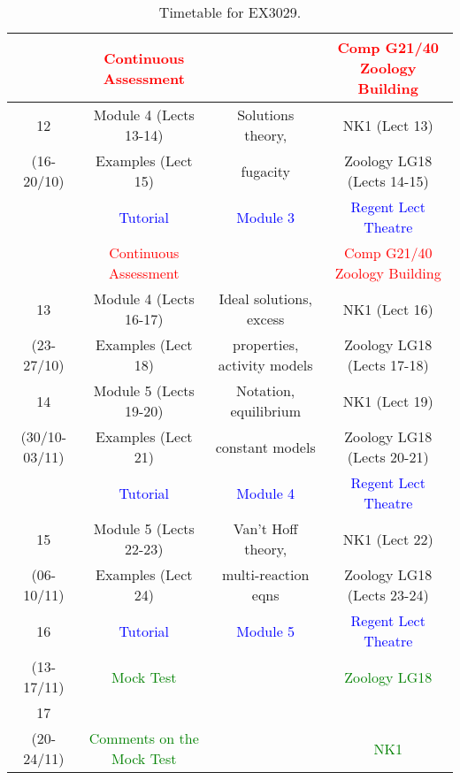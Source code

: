 \documentclass[12pts,a4paper,amsmath,amssymb,floatfix]{article}%
\newcommand{\red}{\textcolor{red}}
\newcommand{\blue}{\textcolor{blue}}
\newcommand{\green}{\textcolor{green}}
\begin{document}
\begin{table}
\begin{center}
\begin{tabular}{c | c c | c}
                        & \red{Continuous Assessment}&                     &    \red{Comp G21/40 Zoology Building} \\ 
      \hline       
             12         &   Module 4 (Lects 13-14) &Solutions theory,      &            NK1  (Lect 13)            \\ 
         (16-20/10)     &   Examples (Lect 15)     &fugacity               &            Zoology LG18 (Lects 14-15)\\
                        &   \blue{Tutorial}        &  \blue{Module 3}      &            \blue{Regent Lect Theatre}\\
                        & \red{Continuous Assessment}&                     &    \red{Comp G21/40 Zoology Building} \\ 
      \hline       
             13         &   Module 4 (Lects 16-17) &Ideal solutions, excess&            NK1  (Lect 16)            \\ 
         (23-27/10)     &   Examples (Lect 18)     &properties, activity models&        Zoology LG18 (Lects 17-18)\\
      \hline       
             14         &   Module 5 (Lects 19-20) &Notation, equilibrium  &            NK1  (Lect 19)            \\ 
      (30/10-03/11)     &   Examples (Lect 21)     &constant models        &            Zoology LG18 (Lects 20-21)\\
                        &   \blue{Tutorial}        &  \blue{Module 4}      &            \blue{Regent Lect Theatre}\\
      \hline       
             15         &   Module 5 (Lects 22-23) &Van't Hoff theory,     &            NK1  (Lect 22)            \\ 
         (06-10/11)     &   Examples (Lect 24)     &multi-reaction eqns    &            Zoology LG18 (Lects 23-24)\\
      \hline       
             16         &   \blue{Tutorial}        &  \blue{Module 5}      &            \blue{Regent Lect Theatre}\\  
         (13-17/11)     &   \green{Mock Test}      &                       &            \green{Zoology LG18}      \\
      \hline       
             17         &                          &                       &                                      \\ 
         (20-24/11)     & \green{Comments on the Mock Test}&               &            \green{NK1}               \\
      \hline       
    \end{tabular}
  \end{center}
\caption{Timetable for EX3029.}
\label{table:timetable}
\end{table}
\end{document}
